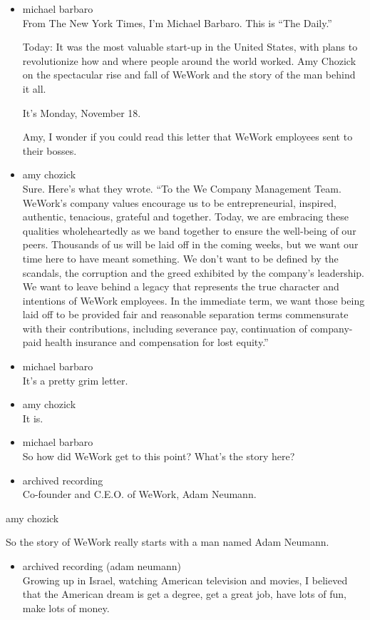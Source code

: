 \begin{itemize}
\item
  michael barbaro\\
  From The New York Times, I'm Michael Barbaro. This is ``The Daily.''

  Today: It was the most valuable start-up in the United States, with
  plans to revolutionize how and where people around the world worked.
  Amy Chozick on the spectacular rise and fall of WeWork and the story
  of the man behind it all.

  It's Monday, November 18.

  Amy, I wonder if you could read this letter that WeWork employees sent
  to their bosses.
\item
  amy chozick\\
  Sure. Here's what they wrote. ``To the We Company Management Team.
  WeWork's company values encourage us to be entrepreneurial, inspired,
  authentic, tenacious, grateful and together. Today, we are embracing
  these qualities wholeheartedly as we band together to ensure the
  well-being of our peers. Thousands of us will be laid off in the
  coming weeks, but we want our time here to have meant something. We
  don't want to be defined by the scandals, the corruption and the greed
  exhibited by the company's leadership. We want to leave behind a
  legacy that represents the true character and intentions of WeWork
  employees. In the immediate term, we want those being laid off to be
  provided fair and reasonable separation terms commensurate with their
  contributions, including severance pay, continuation of company-paid
  health insurance and compensation for lost equity.''
\item
  michael barbaro\\
  It's a pretty grim letter.
\item
  amy chozick\\
  It is.
\item
  michael barbaro\\
  So how did WeWork get to this point? What's the story here?
\item
  archived recording\\
  Co-founder and C.E.O. of WeWork, Adam Neumann.
\end{itemize}

amy chozick

So the story of WeWork really starts with a man named Adam Neumann.

\begin{itemize}
\tightlist
\item
  archived recording (adam neumann)\\
  Growing up in Israel, watching American television and movies, I
  believed that the American dream is get a degree, get a great job,
  have lots of fun, make lots of money.
\end{itemize}

